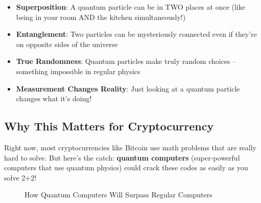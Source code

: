 \documentclass[11pt,a4paper]{article}
\begin{document}
\begin{tcolorbox}[colback=brightgreen!10,colframe=brightgreen,title=\textbf{Mind-Blowing Quantum Facts!}]
\begin{itemize}
    \item \textbf{Superposition}: A quantum particle can be in TWO places at once (like being in your room AND the kitchen simultaneously!)
    \item \textbf{Entanglement}: Two particles can be mysteriously connected even if they're on opposite sides of the universe
    \item \textbf{True Randomness}: Quantum particles make truly random choices -- something impossible in regular physics
    \item \textbf{Measurement Changes Reality}: Just looking at a quantum particle changes what it's doing!
\end{itemize}
\end{tcolorbox}

\subsection{Why This Matters for Cryptocurrency}

Right now, most cryptocurrencies like Bitcoin use math problems that are really hard to solve. But here's the catch: \textbf{quantum computers} (super-powerful computers that use quantum physics) could crack these codes as easily as you solve 2+2!

\begin{figure}[H]
\centering
{}
\caption{How Quantum Computers Will Surpass Regular Computers}
\end{figure}
\end{document}
